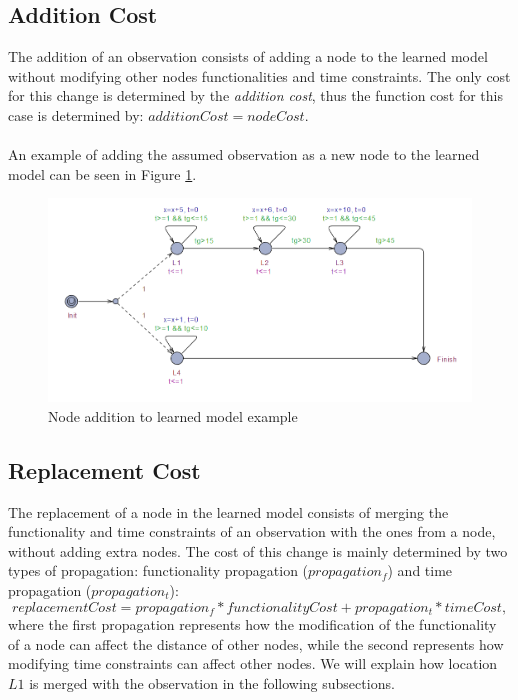 \subsection{Addition Cost}
The addition of an observation consists of adding a node to the learned model without modifying other nodes functionalities and time constraints. The only cost for this change is determined by the \textit{addition cost}, thus the function cost for this case is determined by: $additionCost = nodeCost$. \\ \\
%
An example of adding the assumed observation as a new node to the learned model can be seen in Figure \ref{learned_model_example_addition}. 
%
\begin{figure}[t]
	\centering
	\includegraphics[scale=0.5]{./pictures/learned_model_example_addition.png}
	\caption{Node addition to learned model example}
	\label{learned_model_example_addition}
\end{figure}

\subsection{Replacement Cost}
The replacement of a node in the learned model consists of merging the functionality and time constraints of an observation with the ones from a node, without adding extra nodes. The cost of this change is mainly determined by two types of propagation:  functionality propagation ($propagation_f$) and time propagation ($propagation_t$):
%
\begin{equation}
replacementCost = propagation_f*functionalityCost + propagation_t* timeCost,
\end{equation}
where the first propagation represents how the modification of the functionality of a node can affect the distance of other nodes, while the second represents how modifying time constraints can affect other nodes. We will explain how location $L1$ is merged with the observation in the following subsections. 

